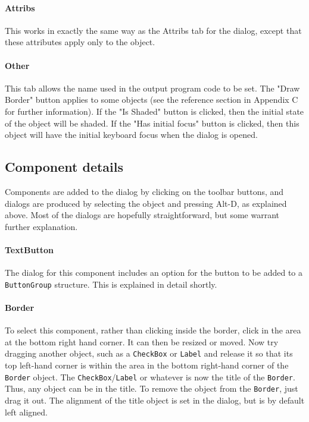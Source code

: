 \paragraph{Attribs}
This works in exactly the same way as the Attribs tab for the dialog,
except that these attributes apply only to the object.

\paragraph{Other}
This tab allows the name used in the output program code to be set.
The "Draw
Border" button applies to some objects (see the reference
section in Appendix C for further information). If the
"Is Shaded" button is clicked, then the
initial state of the object will be shaded. If the "Has
initial focus" button is clicked, then this object will
have the initial keyboard focus when the dialog is
opened.

\subsection*{Component details}

Components are added to the dialog by clicking on the toolbar buttons,
and dialogs are produced by selecting the object and pressing Alt-D, as
explained above. Most of the dialogs are hopefully straightforward, but
some warrant further explanation.

\paragraph{TextButton}
The dialog for this component includes an option for the button to be
added to a \texttt{ButtonGroup} structure. This is explained in detail
shortly.

\paragraph{Border}
To select this component, rather than
clicking inside the border, click in the area at the bottom right hand
corner. It can then be resized or moved. Now try dragging another
object, such as a \texttt{CheckBox} or \texttt{Label} and release it so
that its top left-hand corner is within the area in the bottom
right-hand corner of the \texttt{Border} object. The
\texttt{CheckBox}/\texttt{Label} or whatever is now the title of the
\texttt{Border}. Thus, any object can be in the title. To remove the
object from the \texttt{Border}, just drag it out. The alignment of the
title object is set in the dialog, but is by default left aligned.

